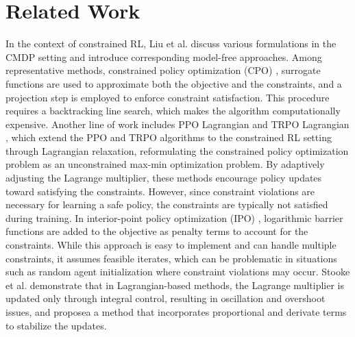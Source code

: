 \section{Related Work}

In the context of constrained RL, Liu et al. \cite{liu2021policy} discuss various formulations in the CMDP setting and introduce corresponding model-free approaches.
Among representative methods, constrained policy optimization (CPO) \cite{achiam2017constrained}, surrogate functions are used to approximate both the objective and the constraints, and a projection step is employed to enforce constraint satisfaction.
This procedure requires a backtracking line search, which makes the algorithm computationally expensive.
Another line of work includes PPO Lagrangian and TRPO Lagrangian \cite{ray2019benchmarking}, which extend the PPO \cite{schulman2017proximal} and TRPO \cite{schulman2015trust} algorithms to the constrained RL setting through Lagrangian relaxation, reformulating the constrained policy optimization problem as an unconstrained max-min optimization problem.
By adaptively adjusting the Lagrange multiplier, these methods encourage policy updates toward satisfying the constraints.
However, since constraint violations are necessary for learning a safe policy, the constraints are typically not satisfied during training.
In interior-point policy optimization (IPO) \cite{liu2020ipo}, logarithmic barrier functions are added to the objective as penalty terms to account for the constraints.
While this approach is easy to implement and can handle multiple constraints, it assumes feasible iterates, which can be problematic in situations such as random agent initialization where constraint violations may occur.
Stooke et al. \cite{stooke2020responsive} demonstrate that in Lagrangian-based methods, the Lagrange multiplier is updated only through integral control, resulting in oscillation and overshoot issues, and proposea a method that incorporates proportional and derivate terms to stabilize the updates.